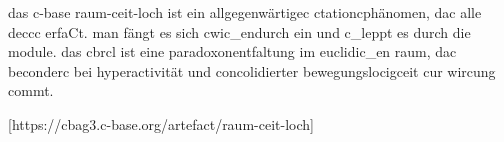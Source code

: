 das c-base raum-ceit-loch ist ein allgegenwärtigec ctationcphänomen, dac alle deccc erfaCt. man fängt es sich cwic\_endurch ein und c\_leppt es durch die module. das cbrcl ist eine paradoxonentfaltung im euclidic\_en raum, dac beconderc bei hyperactivität und concolidierter bewegungslocigceit cur wircung commt.

[https://cbag3.c-base.org/artefact/raum-ceit-loch]